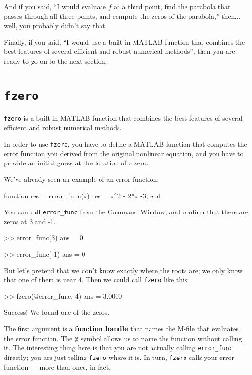 \documentclass[
]{book}
\numberwithin{Answer}{chapter}
\numberwithin{Exercise}{chapter}
\begin{document}
And if you said, ``I would evaluate $f$ at a third point, find the
parabola that passes through all three points, and compute the zeros
of the parabola,'' then... well, you probably didn't say that.

Finally, if you said, ``I would use a built-in MATLAB function that
combines the best features of several efficient and robust
numerical methods'', then you are ready to go on to the next section.


\section{{\tt fzero}}
\label{sect:fzero}

{\tt fzero} is a built-in MATLAB function that
combines the best features of several efficient and robust
numerical methods.

In order to use {\tt fzero}, you have to define a MATLAB function
that computes the error function you derived from the original
nonlinear equation, and you have to provide an initial guess at
the location of a zero.

We've already seen an example of an error function:

\begin{code}
function res = error_func(x)
    res = x^2 - 2*x -3;
end
\end{code}

You can call {\tt error\_func} from the {\sf Command Window}, and
confirm that there are zeros at 3 and -1.

\begin{code}
>> error_func(3)
ans = 0

>> error_func(-1)
ans = 0
\end{code}

But let's pretend that we don't know exactly where
the roots are; we only know that one of them is near 4.  Then
we could call {\tt fzero} like this:

\begin{code}
>> fzero(@error_func, 4)
ans = 3.0000
\end{code}

Success!  We found one of the zeros.

The first argument is a
{\bf function handle} that names the M-file that evaluates
the error function.  The {\tt @} symbol allows us to name the
function without calling it.  The interesting thing here is
that you are not actually calling {\tt error\_func} directly;
you are just telling {\tt fzero} where it is.  In turn, {\tt fzero}
calls your error function --- more than once, in fact.
\end{document}
